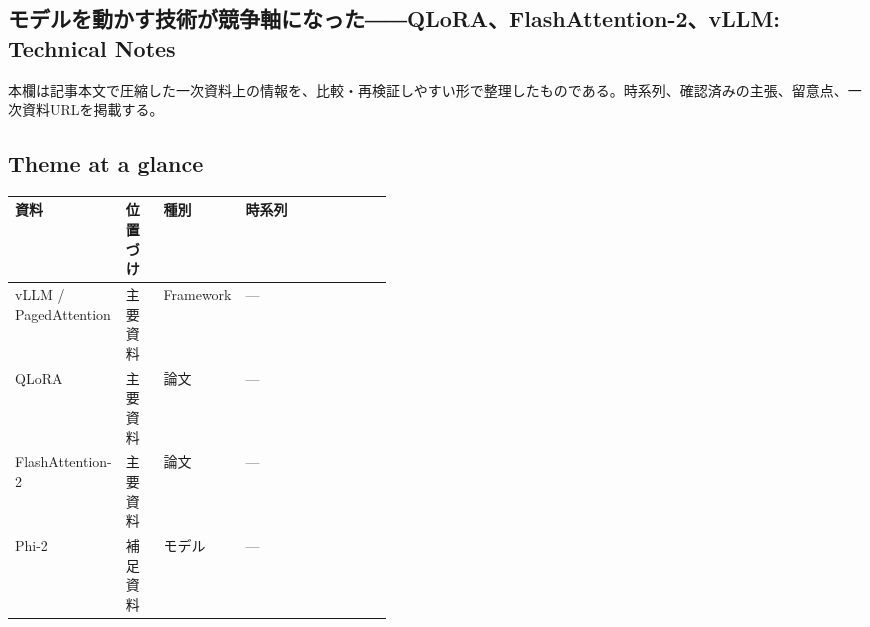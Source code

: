 \subsection*{モデルを動かす技術が競争軸になった――QLoRA、FlashAttention-2、vLLM: Technical Notes}
本欄は記事本文で圧縮した一次資料上の情報を、比較・再検証しやすい形で整理したものである。時系列、確認済みの主張、留意点、一次資料URLを掲載する。
\smallskip
{}\par
\medskip
\subsection*{Theme at a glance}
\begin{center}
\footnotesize
\begin{tabularx}{\linewidth}{@{}p{0.20\linewidth}p{0.10\linewidth}p{0.14\linewidth}X@{}}
\toprule
資料 & 位置づけ & 種別 & 時系列 \\
\midrule
vLLM / PagedAttention & 主要資料 & Framework & — \\
QLoRA & 主要資料 & 論文 & — \\
FlashAttention-2 & 主要資料 & 論文 & — \\
Phi-2 & 補足資料 & モデル & — \\
\bottomrule
\end{tabularx}
\end{center}
\normalsize

